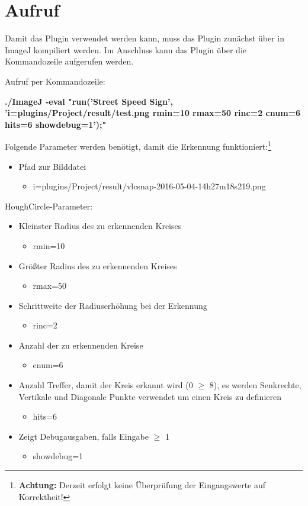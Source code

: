 \section{Aufruf}
Damit das Plugin verwendet werden kann, muss das Plugin zunächst über  in ImageJ kompiliert werden.
Im Anschluss kann das Plugin über die Kommandozeile aufgerufen werden.

Aufruf per Kommandozeile:

\begin{small}
\textbf{./ImageJ -eval "run('Street Speed Sign', 'i=plugins/Project/result/test.png rmin=10 rmax=50 rinc=2 cnum=6 hits=6 showdebug=1');"}
\end{small}

Folgende Parameter werden benötigt, damit die Erkennung funktioniert:\footnote{\textbf{Achtung:} Derzeit erfolgt keine Überprüfung der Eingangswerte auf Korrektheit!}

\begin{itemize}
	\item Pfad zur Bilddatei
	\begin{itemize}
		\item i=plugins/Project/result/vlcsnap-2016-05-04-14h27m18s219.png
	\end{itemize}
	\end{itemize}
HoughCircle-Parameter:
\begin{itemize}
	\item Kleinster Radius des zu erkennenden Kreises
	\begin{itemize}
		 \item rmin=10
	\end{itemize}
	\item Größter Radius des zu erkennenden Kreises
	\begin{itemize}
		\item rmax=50
	\end{itemize}
	\item Schrittweite der Radiuserhöhung bei der Erkennung
	\begin{itemize}
		\item rinc=2
	\end{itemize}
	\item Anzahl der zu erkennenden Kreise
	\begin{itemize}
		\item cnum=6
	\end{itemize}
	\item Anzahl Treffer, damit der Kreis erkannt wird (0 $\ge$ 8), es werden Senkrechte, Vertikale und Diagonale Punkte verwendet um einen Kreis zu definieren
	\begin{itemize}
		\item hits=6
	\end{itemize}
	\item Zeigt Debugausgaben, falls Eingabe $\ge$ 1
	\begin{itemize}
		\item showdebug=1
	\end{itemize}
\end{itemize}
